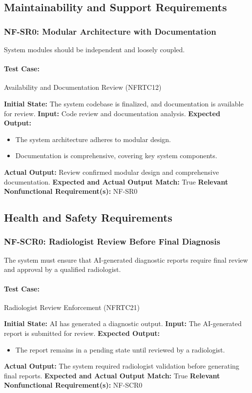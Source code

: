 \documentclass[12pt, titlepage]{article}
\begin{document}
\subsection{Maintainability and Support Requirements}

\subsubsection{NF-SR0: Modular Architecture with Documentation}
System modules should be independent and loosely coupled.

\paragraph{Test Case:} Availability and Documentation Review (NFRTC12)

\textbf{Initial State:} The system codebase is finalized, and documentation is available for review.  
\textbf{Input:} Code review and documentation analysis.  
\textbf{Expected Output:}
\begin{itemize}
    \item The system architecture adheres to modular design.
    \item Documentation is comprehensive, covering key system components.
\end{itemize}
\textbf{Actual Output:} Review confirmed modular design and comprehensive documentation.  
\textbf{Expected and Actual Output Match:} True  
\textbf{Relevant Nonfunctional Requirement(s):} NF-SR0  

\subsection{Health and Safety Requirements}

\subsubsection{NF-SCR0: Radiologist Review Before Final Diagnosis}
The system must ensure that AI-generated diagnostic reports require final review and approval by a qualified radiologist.

\paragraph{Test Case:} Radiologist Review Enforcement (NFRTC21)

\textbf{Initial State:} AI has generated a diagnostic output.  
\textbf{Input:} The AI-generated report is submitted for review.  
\textbf{Expected Output:}
\begin{itemize}
    \item The report remains in a pending state until reviewed by a radiologist.
\end{itemize}
\textbf{Actual Output:} The system required radiologist validation before generating final reports.  
\textbf{Expected and Actual Output Match:} True  
\textbf{Relevant Nonfunctional Requirement(s):} NF-SCR0  
\end{document}
